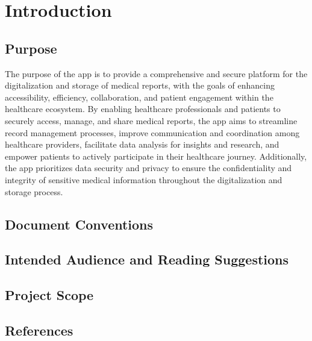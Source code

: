 {
\chapter{Introduction}
\section{Purpose}
 The purpose of the app is to provide a comprehensive and secure platform for the digitalization and storage of medical reports, with the goals of enhancing accessibility, efficiency, collaboration, and patient engagement within the healthcare ecosystem. By enabling healthcare professionals and patients to securely access, manage, and share medical reports, the app aims to streamline record management processes, improve communication and coordination among healthcare providers, facilitate data analysis for insights and research, and empower patients to actively participate in their healthcare journey. Additionally, the app prioritizes data security and privacy to ensure the confidentiality and integrity of sensitive medical information throughout the digitalization and storage process.

\section{Document Conventions}
\section{Intended Audience and Reading Suggestions}
\section{Project Scope}
\section{References}
}
